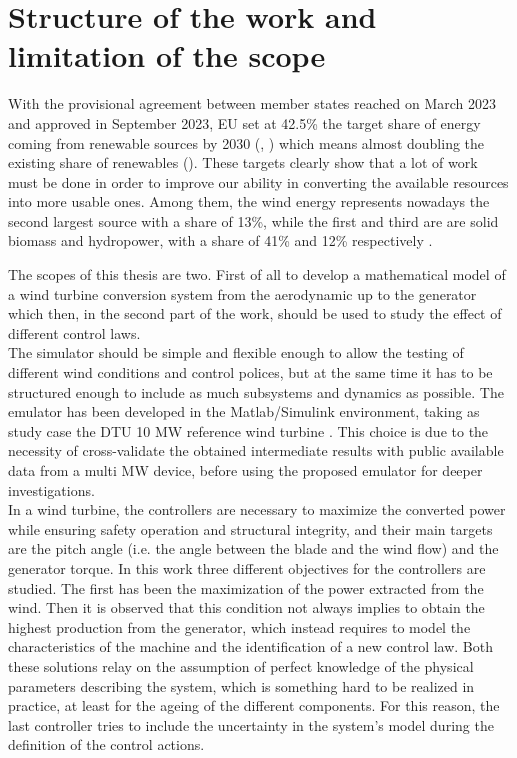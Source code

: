 \newpage
\section{Structure of the work and limitation of the scope}\label{sec:b_introduction}
With the provisional agreement between member states reached on March 2023 and approved in September 2023, EU set at 42.5\% the target share of energy coming from renewable sources by 2030 (\cite{rauters}, \cite{EU_targets}) which means almost doubling the existing share of renewables (\cite{EU_targets}). These targets clearly show that a lot of work must be done in order to improve our ability in converting the available resources into more usable ones. Among them, the wind energy represents nowadays the second largest source with a share of 13\%, while the first and third are are solid biomass and hydropower, with a share of 41\% and 12\% respectively \cite{ren_share}. 

The scopes of this thesis are two. First of all to develop a mathematical model of a wind turbine conversion system from the aerodynamic up to the generator which then, in the second part of the work, should be used to study the effect of different control laws.\\
The simulator should be simple and flexible enough to allow the testing of different wind conditions and control polices, but at the same time it has to be structured enough to include as much subsystems and dynamics as possible. The emulator has been developed in the Matlab/Simulink environment, taking as study case the DTU 10 MW reference wind turbine \cite{DTU_Wind_Energy_Report-I-0092}. This choice is due to the necessity of cross-validate the obtained intermediate results with public available data from a multi MW device, before using the proposed emulator for deeper investigations.\\
In a wind turbine, the controllers are necessary to maximize the converted power while ensuring safety operation and structural integrity, and their main targets are the pitch angle (i.e. the angle between the blade and the wind flow) and the generator torque. In this work three different objectives for the controllers are studied. The first has been the maximization of the power extracted from the wind. Then it is observed that this condition not always implies to obtain the highest production from the generator, which instead requires to model the characteristics of the machine and the identification of a new control law. Both these solutions relay on the assumption of perfect knowledge of the physical parameters describing the system, which is something hard to be realized in practice, at least for the ageing of the different components. For this reason, the last controller tries to include the uncertainty in the system's model during the definition of the control actions.  

